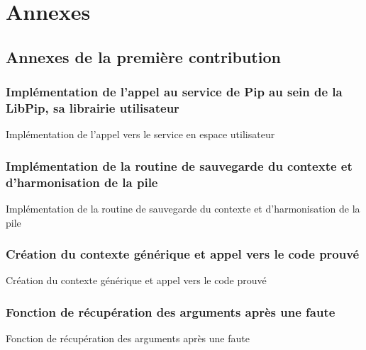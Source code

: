 \part{Annexes}

\chapter{Annexes de la première contribution}

\section{Implémentation de l'appel au service de Pip au sein de la LibPip, sa librairie utilisateur}

\begin{listing}[!ht]
	\caption{Implémentation de l'appel vers le service en espace utilisateur}
	\label{code:libpip_yield}
\end{listing}

\newpage
\section{Implémentation de la routine de sauvegarde du contexte et d'harmonisation de la pile}

\begin{codeenv}
	\caption{Implémentation de la routine de sauvegarde du contexte et d'harmonisation de la pile}
	\label{code:cg_yieldGlue}
\end{codeenv}

\newpage
\section{Création du contexte générique et appel vers le code prouvé}

\begin{codeenv}
	\caption{Création du contexte générique et appel vers le code prouvé}
	\label{code:yieldGlue}
\end{codeenv}

\newpage
\section{Fonction de récupération des arguments après une faute}

\begin{codeenv}
	\caption{Fonction de récupération des arguments après une faute}
	\label{code:faultInterruptHandler}
\end{codeenv}

